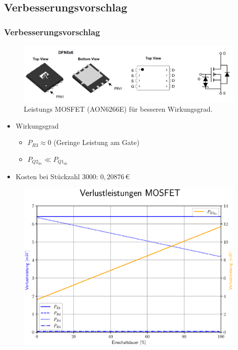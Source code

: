 \documentclass{beamer}
\begin{document}
	\subsection{Verbesserungsvorschlag}
	\begin{frame}
		\frametitle{Verbesserungsvorschlag}
		\begin{center}
			\begin{figure}[tbh]
				\centering
				\includegraphics[width=1\linewidth]{medien/V3-4.png}
				\caption[MOSFET]{Leistungs MOSFET (AON6266E) für besseren Wirkungsgrad.}
			\end{figure}
		\end{center}
		\begin{itemize}
			\item{Wirkungsgrad}
			\begin{itemize}
				\item{$P_{R3} \approx 0$ (Geringe Leistung am Gate)}
				\item{$P_{Q2_{ds}} \ll P_{Q1_{ds}}$}
			\end{itemize}
			\item{Kosten bei Stückzahl 3000: $0,20876\,$\euro}
		\end{itemize}
	\end{frame}
	\begin{frame}
		\begin{center}
			\begin{figure}[tbh]
				\centering
				\includegraphics[width=0.95\linewidth]{medien/5.eps}
			\end{figure}
		\end{center}
	\end{frame}
\end{document}
